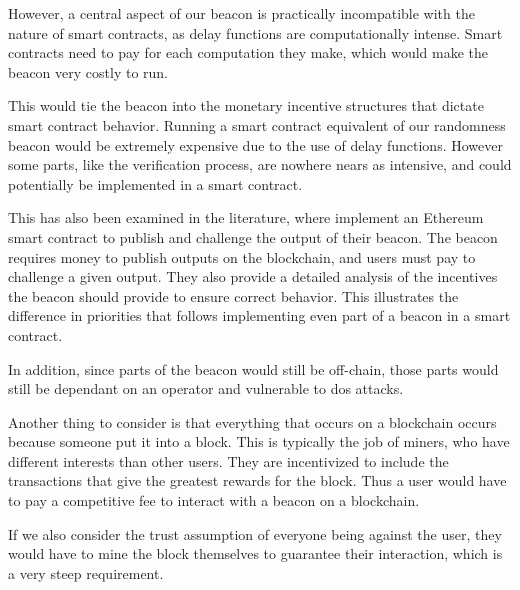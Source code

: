 However, a central aspect of our beacon is practically incompatible with the nature of smart contracts, as delay functions are computationally intense. Smart contracts need to pay for each computation they make, which would make the beacon very costly to run.

This would tie the beacon into the monetary incentive structures that dictate smart contract behavior. Running a smart contract equivalent of our randomness beacon would be extremely expensive due to the use of delay functions. However some parts, like the verification process, are nowhere nears as intensive, and could potentially be implemented in a smart contract.

This has also been examined in the literature, where \citet{bunz2017proofsof} implement an Ethereum smart contract to publish and challenge the output of their beacon. The beacon requires money to publish outputs on the blockchain, and users must pay to challenge a given output. They also provide a detailed analysis of the incentives the beacon should provide to ensure correct behavior. This illustrates the difference in priorities that follows implementing even part of a beacon in a smart contract.

In addition, since parts of the beacon would still be off-chain, those parts would still be dependant on an operator and vulnerable to \acrshort{dos} attacks.



Another thing to consider is that everything that occurs on a blockchain occurs because someone put it into a block. This is typically the job of miners, who have different interests than other users. They are incentivized to include the transactions that give the greatest rewards for the block. Thus a user would have to pay a competitive fee to interact with a beacon on a blockchain.

If we also consider the trust assumption of everyone being against the user, they would have to mine the block themselves to guarantee their interaction, which is a very steep requirement.